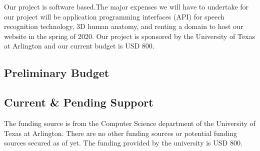 Our project is software based.The major expenses we will have to undertake for our project will be application programming interfaces (API) for speech recognition technology, 3D human anatomy, and renting a domain to host our website in the spring of 2020. Our project is sponsored by the University of Texas at Arlington and our current budget is USD 800.

\subsection{Preliminary Budget}
\begin{table}[h]
\caption{Overview of preliminary budget} 
\end{table}

\subsection{Current \& Pending Support}
The funding source is from the Computer Science department of the University of Texas at Arlington. There are no other funding sources or potential funding sources secured as of yet. The funding provided by the university is USD 800.